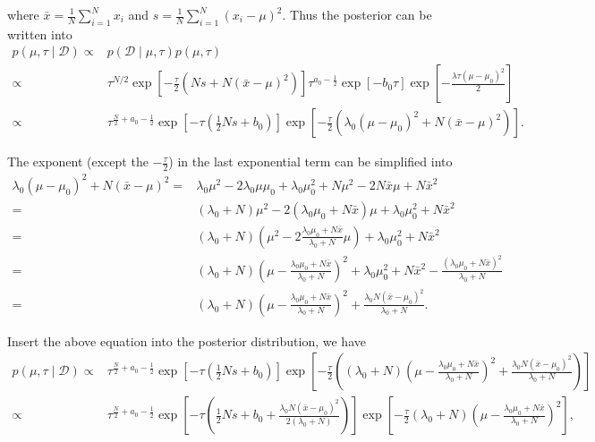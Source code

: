 \documentclass[11pt]{extarticle}
\newcommand{\D}{\mathcal{D}}
\newcommand{\0}{\mathbf{0}}
\renewcommand{\(}{\left(}
\renewcommand{\)}{\right)}
\theoremstyle{definition}
\begin{document}
where $\bar{x} = \frac{1}{N}\sum_{i=1}^{N}x_{i}$ and $s = \frac{1}{N}\sum_{i=1}^{N}(x_{i}-\mu)^{2}$. Thus the posterior can be written into \cite{Doing}
\begin{align*}
	p(\mu, \tau \mid \D) \propto& p(\D \mid \mu, \tau) p(\mu, \tau) \\
	\propto& \tau^{N/2} \exp\left[-\frac{\tau}{2}\(Ns+N(\bar{x}-\mu)^{2}\)\right] \tau^{a_{0}-\frac{1}{2}} \exp\left[-b_{0}\tau\right] \exp\left[-\frac{ \lambda \tau(\mu - \mu_{0})^2}{2}\right] \\
	\propto& \tau^{\frac{N}{2} + a_{0} - \frac{1}{2}} \exp\left[-\tau\left(\frac{1}{2}Ns + b_{0}\right)\right]\exp\left[-\frac{\tau}{2}\left(\lambda_{0}(\mu - \mu_{0})^{2} + N(\bar{x} - \mu)^{2}\right)\right].
\end{align*}
\par The exponent (except the $-\frac{\tau}{2}$) in the last exponential term can be simplified into
\begin{align*}
	\lambda_{0}(\mu - \mu_{0})^{2} + N(\bar{x} - \mu)^{2} =& \lambda_{0} \mu^{2} - 2\lambda_{0}\mu\mu_{0} + \lambda_{0}\mu_{0}^{2} + N\mu^{2} - 2N\bar{x}\mu + N\bar{x}^{2} \\
	=& (\lambda_{0} + N)\mu^{2} - 2(\lambda_{0}\mu_{0} + N\bar{x})\mu + \lambda_{0}\mu_{0}^{2} + N\bar{x}^{2} \\
	=& (\lambda_{0} + N)\left( \mu^{2} - 2\frac{\lambda_{0}\mu_{0} + N\bar{x}}{\lambda_{0} + N}\mu \right) + \lambda_{0}\mu_{0}^{2} + N\bar{x}^{2} \\
	=& (\lambda_{0} + N)\left( \mu - \frac{\lambda_{0}\mu_{0} + N \bar{x}}{\lambda_{0} + N} \right)^{2} + \lambda_{0}\mu_{0}^{2} + N\bar{x}^{2} - \frac{(\lambda_{0}\mu_{0} + N\bar{x})^{2}}{\lambda_{0} + N} \\
	=& (\lambda_{0} + N)\left( \mu - \frac{\lambda_{0}\mu_{0} + N\bar{x}}{\lambda_{0} + N} \right)^{2} + \frac{\lambda_{0}N(\bar{x} - \mu_{0})^{2}}{\lambda_{0} + N}.
\end{align*}
\par Insert the above equation into the posterior distribution, we have
\begin{align*}
	p(\mu, \tau \mid \D) \propto& \tau^{\frac{N}{2} + a_{0} - \frac{1}{2}} \exp\left[-\tau\left(\frac{1}{2}Ns + b_{0}\right)\right] \exp\left[-\frac{\tau}{2}\left( (\lambda_{0} + N)\left( \mu - \frac{\lambda_{0}\mu_{0} + N\bar{x}}{\lambda_{0} + N} \right)^{2} + \frac{\lambda_{0}N(\bar{x} - \mu_{0})^{2}}{\lambda_{0} + N} \right)\right] \\
	\propto& \tau^{\frac{N}{2} + a_{0} - \frac{1}{2}} \exp\left[-\tau\left(\frac{1}{2}Ns + b_{0} + \frac{\lambda_{0}N(\bar{x} - \mu_{0})^{2}}{2(\lambda_{0} + N)}\right)\right] \exp\left[-\frac{\tau}{2} (\lambda_{0} + N)\left( \mu - \frac{\lambda_{0}\mu_{0} + N\bar{x}}{\lambda_{0} + N} \right)^{2} \right],
\end{align*}
\end{document}
